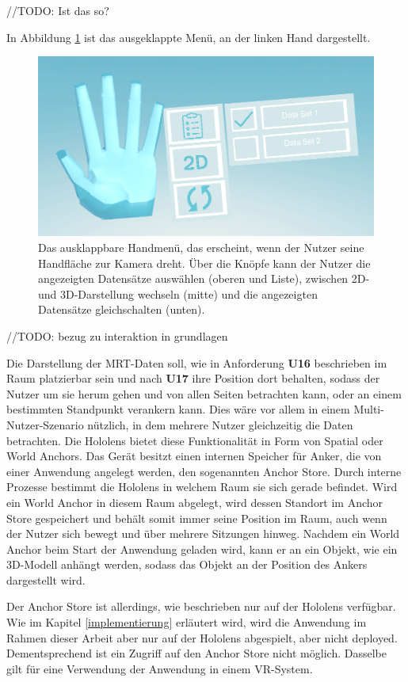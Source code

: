 //TODO: Ist das so?

In Abbildung \ref{img:handUI} ist das ausgeklappte Menü, an der linken Hand dargestellt.

\begin{figure}
	\centering
	\includegraphics[width=0.7\linewidth]{images/handUI.png}
	\caption{Das ausklappbare Handmenü, das erscheint, wenn der Nutzer seine Handfläche zur Kamera dreht. Über die Knöpfe kann der Nutzer die angezeigten Datensätze auswählen (oberen und Liste), zwischen 2D- und 3D-Darstellung wechseln (mitte) und die angezeigten Datensätze gleichschalten (unten). }
	\label{img:handUI}
\end{figure}

//TODO:
bezug zu interaktion in grundlagen

Die Darstellung der MRT-Daten soll, wie in Anforderung \textbf{U16} beschrieben im Raum platzierbar sein und nach \textbf{U17} ihre Position dort behalten, sodass der Nutzer um sie herum gehen und von allen Seiten betrachten kann, oder an einem bestimmten Standpunkt verankern kann. Dies wäre vor allem in einem Multi-Nutzer-Szenario nützlich, in dem mehrere Nutzer gleichzeitig die Daten betrachten.
Die Hololens bietet diese Funktionalität in Form von Spatial oder World Anchors. Das Gerät besitzt einen internen Speicher für Anker, die von einer Anwendung angelegt werden, den sogenannten Anchor Store. Durch interne Prozesse bestimmt die Hololens in welchem Raum sie sich gerade befindet. Wird ein World Anchor in diesem Raum abgelegt, wird dessen Standort im Anchor Store gespeichert und behält somit immer seine Position im Raum, auch wenn der Nutzer sich bewegt und über mehrere Sitzungen hinweg. Nachdem ein World Anchor beim Start der Anwendung geladen wird, kann er an ein Objekt, wie ein 3D-Modell anhängt werden, sodass das Objekt an der Position des Ankers dargestellt wird. 

Der Anchor Store ist allerdings, wie beschrieben nur auf der Hololens verfügbar. Wie im Kapitel \ref{implementierung} erläutert wird, wird die Anwendung im Rahmen dieser Arbeit aber nur auf der Hololens abgespielt, aber nicht deployed. Dementsprechend ist ein Zugriff auf den Anchor Store nicht möglich. Dasselbe gilt für eine Verwendung der Anwendung in einem VR-System.

